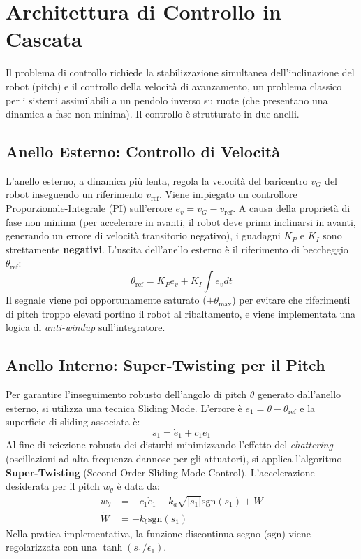 \documentclass[11pt,a4paper]{article}
\begin{document}
\section{Architettura di Controllo in Cascata}

Il problema di controllo richiede la stabilizzazione simultanea dell'inclinazione del robot (pitch) e il controllo della velocità di avanzamento, un problema classico per i sistemi assimilabili a un pendolo inverso su ruote (che presentano una dinamica a fase non minima). Il controllo è strutturato in due anelli.

\subsection{Anello Esterno: Controllo di Velocità}
L'anello esterno, a dinamica più lenta, regola la velocità del baricentro $v_G$ del robot inseguendo un riferimento $v_{\text{ref}}$.
Viene impiegato un controllore Proporzionale-Integrale (PI) sull'errore $e_v = v_G - v_{\text{ref}}$. A causa della proprietà di fase non minima (per accelerare in avanti, il robot deve prima inclinarsi in avanti, generando un errore di velocità transitorio negativo), i guadagni $K_P$ e $K_I$ sono strettamente \textbf{negativi}.
L'uscita dell'anello esterno è il riferimento di beccheggio $\theta_{\text{ref}}$:
\begin{equation}
    \theta_{\text{ref}} = K_P e_v + K_I \int e_v dt
\end{equation}
Il segnale viene poi opportunamente saturato ($\pm \theta_{\max}$) per evitare che riferimenti di pitch troppo elevati portino il robot al ribaltamento, e viene implementata una logica di \textit{anti-windup} sull'integratore.

\subsection{Anello Interno: Super-Twisting per il Pitch}
Per garantire l'inseguimento robusto dell'angolo di pitch $\theta$ generato dall'anello esterno, si utilizza una tecnica Sliding Mode. L'errore è $e_1 = \theta - \theta_{\text{ref}}$ e la superficie di sliding associata è:
\begin{equation}
    s_1 = \dot{e}_1 + c_1 e_1
\end{equation}
Al fine di reiezione robusta dei disturbi minimizzando l'effetto del \textit{chattering} (oscillazioni ad alta frequenza dannose per gli attuatori), si applica l'algoritmo \textbf{Super-Twisting} (Second Order Sliding Mode Control). L'accelerazione desiderata per il pitch $w_\theta$ è data da:
\begin{align}
    w_\theta &= -c_1 \dot{e}_1 - k_a \sqrt{|s_1|} \text{sgn}(s_1) + W \\
    \dot{W} &= -k_b \text{sgn}(s_1)
\end{align}
Nella pratica implementativa, la funzione discontinua segno ($\text{sgn}$) viene regolarizzata con una $\tanh(s_1/\epsilon_1)$.
\end{document}
